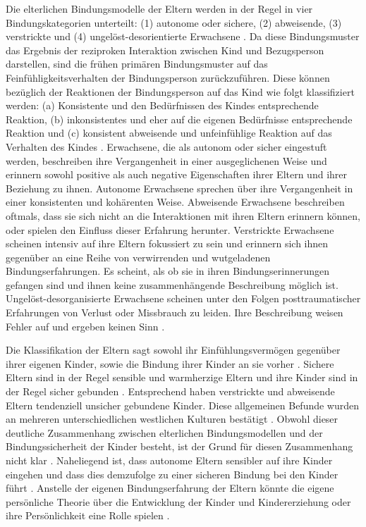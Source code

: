 Die elterlichen Bindungsmodelle der Eltern werden in der Regel in vier Bindungskategorien unterteilt: (1) autonome oder sichere, (2) abweisende, (3) verstrickte und (4) ungelöst-desorientierte Erwachsene \cite[S.~593ff]{Siegler2008}. Da diese Bindungsmuster das Ergebnis der reziproken Interaktion zwischen Kind und Bezugsperson darstellen, sind die frühen primären Bindungsmuster auf das Feinfühligkeitsverhalten der Bindungsperson zurückzuführen. Diese können bezüglich der Reaktionen der Bindungsperson auf das Kind wie folgt klassifiziert werden: (a) Konsistente und den Bedürfnissen des Kindes entsprechende Reaktion, (b) inkonsistentes und eher auf die eigenen Bedürfnisse entsprechende Reaktion und (c) konsistent abweisende und unfeinfühlige Reaktion auf das Verhalten des Kindes \cite{Schmidt2004}. 
Erwachsene, die als autonom oder sicher eingestuft werden, beschreiben ihre Vergangenheit in einer ausgeglichenen Weise und erinnern sowohl positive als auch negative Eigenschaften ihrer Eltern und ihrer Beziehung zu ihnen. Autonome Erwachsene sprechen über ihre Vergangenheit in einer konsistenten und kohärenten Weise. Abweisende Erwachsene beschreiben oftmals, dass sie sich nicht an die Interaktionen mit ihren Eltern erinnern können, oder spielen den Einfluss dieser Erfahrung herunter. Verstrickte Erwachsene scheinen intensiv auf ihre Eltern fokussiert zu sein und erinnern sich ihnen gegenüber an eine Reihe von verwirrenden und wutgeladenen Bindungserfahrungen. Es scheint, als ob sie in ihren Bindungserinnerungen gefangen sind und ihnen keine zusammenhängende Beschreibung möglich ist. Ungelöst-desorganisierte Erwachsene scheinen unter den Folgen posttraumatischer Erfahrungen von Verlust oder Missbrauch zu leiden. Ihre Beschreibung weisen Fehler auf und ergeben keinen Sinn \cite{Schmidt2004}.

Die Klassifikation der Eltern sagt sowohl ihr Einfühlungsvermögen gegenüber ihrer eigenen Kinder, sowie die Bindung ihrer Kinder an sie vorher \cite{Siegler2008}. Sichere Eltern sind in der Regel sensible und warmherzige Eltern und ihre Kinder sind in der Regel sicher gebunden \cite{Magai2000, Steele1996}. Entsprechend haben verstrickte und abweisende Eltern tendenziell unsicher gebundene Kinder. Diese allgemeinen Befunde wurden an mehreren unterschiedlichen westlichen Kulturen bestätigt \cite{Hesse1999}. Obwohl dieser deutliche Zusammenhang zwischen elterlichen Bindungsmodellen und der Bindungssicherheit der Kinder besteht, ist der Grund für diesen Zusammenhang nicht klar \cite{Siegler2008}. Naheliegend ist, dass autonome Eltern sensibler auf ihre Kinder eingehen und dass dies demzufolge zu einer sicheren Bindung bei den Kinder führt \cite{Pederson1998}. Anstelle der eigenen Bindungserfahrung der Eltern könnte die eigene persönliche Theorie über die Entwicklung der Kinder und Kindererziehung oder ihre Persönlichkeit  eine Rolle spielen \cite{Thompson1998}.

